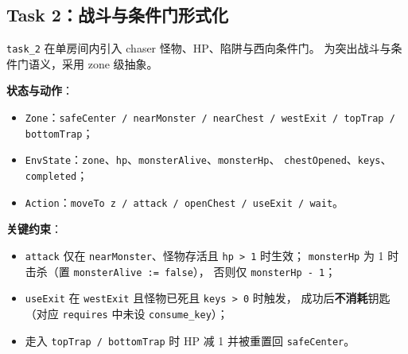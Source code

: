 \documentclass[12pt,a4paper]{ctexart}
\begin{document}
\subsection{Task 2：战斗与条件门形式化}

\texttt{task\_2} 在单房间内引入 chaser 怪物、HP、陷阱与西向条件门。
为突出战斗与条件门语义，采用 zone 级抽象。

\textbf{状态与动作}：
\begin{itemize}[leftmargin=2em]
  \item \texttt{Zone}：\texttt{safeCenter / nearMonster / nearChest / westExit / topTrap / bottomTrap}；
  \item \texttt{EnvState}：\texttt{zone}、\texttt{hp}、\texttt{monsterAlive}、\texttt{monsterHp}、
  \texttt{chestOpened}、\texttt{keys}、\texttt{completed}；
  \item \texttt{Action}：\texttt{moveTo z / attack / openChest / useExit / wait}。
\end{itemize}

\textbf{关键约束}：
\begin{itemize}[leftmargin=2em]
  \item \texttt{attack} 仅在 \texttt{nearMonster}、怪物存活且 \texttt{hp > 1} 时生效；
  \texttt{monsterHp} 为 1 时击杀（置 \texttt{monsterAlive := false}），
  否则仅 \texttt{monsterHp - 1}；
  \item \texttt{useExit} 在 \texttt{westExit} 且怪物已死且 \texttt{keys > 0} 时触发，
  成功后\textbf{不消耗}钥匙（对应 \texttt{requires} 中未设 \texttt{consume\_key}）；
  \item 走入 \texttt{topTrap / bottomTrap} 时 HP 减 1 并被重置回 \texttt{safeCenter}。
\end{itemize}
\end{document}
